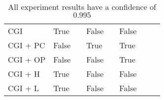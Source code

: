 \begin{table}[H]
\begin{tabular}{l|l|l|l|l|l|l|l}
    CGI       & True &\relax[0.990, 1] & False & \relax[0, 0.01] & False & \relax[0, 0.01]                                                                                     & ~ \\
    CGI + PC  & False & \relax[0.723, 0.733] & True & \relax[0.227, 0.237] & True & \relax[0.031, 0.041]        & ~ \\
    CGI + OP  & False & \relax[0.990, 1] & False & \relax[0, 0.01] & True & \relax[0, 0.01]                                                                                     & ~ \\
    CGI + H   & True &\relax[0.990, 1] & False & \relax[0, 0.01] & False & \relax[0, 0.01]                                                                                    & ~ \\
    CGI + L   & True & \relax[0.990, 1] & False & \relax[0, 0.01] & False & \relax[0, 0.01]                                                                                    & ~ \\
    \end{tabular}
    \caption{All experiment results have a confidence of $0.995$}
\end{table}
